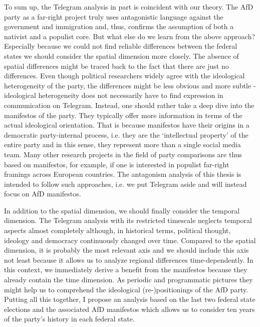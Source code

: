 \documentclass[a4paper]{scrreprt}
\begin{document}
To sum up, the Telegram analysis in part is coincident with our theory. The AfD party as a far-right project truly uses antagonistic language against the government and immigration and, thus, confirms the assumption of both a nativist and a populist core. But what else do we learn from the above approach? Especially because we could not find reliable differences between the federal states we should consider the spatial dimension more closely. The absence of spatial differences might be traced back to the fact that there are just no differences. Even though political researchers widely agree with the ideological heterogeneity of the party, the differences might be less obvious and more subtle - ideological heterogeneity does not necessarily have to find expression in communication on Telegram. Instead, one should rather take a deep dive into the manifestos of the party. They typically offer more information in terms of the actual ideological orientation. \cite[p.~7]{pfahl:2019} That is because manifestos have their origins in a democratic party-internal process, i.e. they are the `intellectual property' of the entire party and in this sense, they represent more than a single social media team. Many other research projects in the field of party comparisons are thus based on manifestos, for example, if one is interested in populist far-right framings across European countries. \citep{kranert:2019} The antagonism analysis of this thesis is intended to follow such approaches, i.e. we put Telegram aside and will instead focus on AfD manifestos.\par
In addition to the spatial dimension, we should finally consider the temporal dimension. The Telegram analysis with its restricted timescale neglects temporal aspects almost completely although, in historical terms, political thought, ideology and democracy continuously changed over time. Compared to the spatial dimension, it is probably the most relevant axis and we should include this axis not least because it allows us to analyze regional differences time-dependently. In this context, we immediately derive a benefit from the manifestos because they already contain the time dimension. As periodic and programmatic pictures they might help us to comprehend the ideological (re-)positionings of the AfD party. Putting all this together, I propose an analysis based on the last two federal state elections and the associated AfD manifestos which allows us to consider ten years of the party's history in each federal state.
\end{document}
